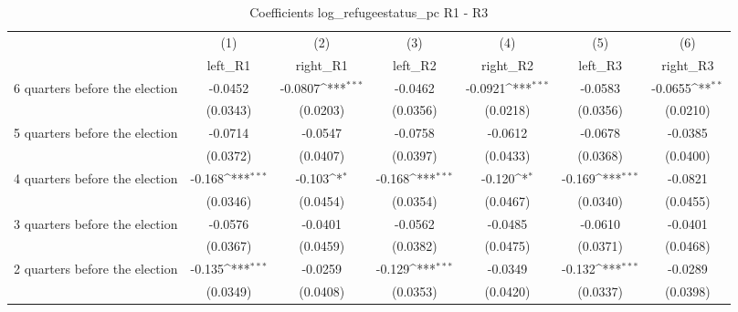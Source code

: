 \begin{table}[htbp]\centering
\def\sym#1{\ifmmode^{#1}\else\(^{#1}\)\fi}
\caption{Coefficients log\_refugeestatus\_pc R1 - R3}
\begin{tabular}{l*{6}{c}}
\hline\hline
                    &\multicolumn{1}{c}{(1)}&\multicolumn{1}{c}{(2)}&\multicolumn{1}{c}{(3)}&\multicolumn{1}{c}{(4)}&\multicolumn{1}{c}{(5)}&\multicolumn{1}{c}{(6)}\\
                    &\multicolumn{1}{c}{left\_R1}&\multicolumn{1}{c}{right\_R1}&\multicolumn{1}{c}{left\_R2}&\multicolumn{1}{c}{right\_R2}&\multicolumn{1}{c}{left\_R3}&\multicolumn{1}{c}{right\_R3}\\
\hline
 6 quarters before the election&     -0.0452         &     -0.0807\sym{***}&     -0.0462         &     -0.0921\sym{***}&     -0.0583         &     -0.0655\sym{**} \\
                    &    (0.0343)         &    (0.0203)         &    (0.0356)         &    (0.0218)         &    (0.0356)         &    (0.0210)         \\
[1em]
 5 quarters before the election&     -0.0714         &     -0.0547         &     -0.0758         &     -0.0612         &     -0.0678         &     -0.0385         \\
                    &    (0.0372)         &    (0.0407)         &    (0.0397)         &    (0.0433)         &    (0.0368)         &    (0.0400)         \\
[1em]
 4 quarters before the election&      -0.168\sym{***}&      -0.103\sym{*}  &      -0.168\sym{***}&      -0.120\sym{*}  &      -0.169\sym{***}&     -0.0821         \\
                    &    (0.0346)         &    (0.0454)         &    (0.0354)         &    (0.0467)         &    (0.0340)         &    (0.0455)         \\
[1em]
 3 quarters before the election&     -0.0576         &     -0.0401         &     -0.0562         &     -0.0485         &     -0.0610         &     -0.0401         \\
                    &    (0.0367)         &    (0.0459)         &    (0.0382)         &    (0.0475)         &    (0.0371)         &    (0.0468)         \\
[1em]
 2 quarters before the election&      -0.135\sym{***}&     -0.0259         &      -0.129\sym{***}&     -0.0349         &      -0.132\sym{***}&     -0.0289         \\
                    &    (0.0349)         &    (0.0408)         &    (0.0353)         &    (0.0420)         &    (0.0337)         &    (0.0398)         \\

\end{tabular}
\end{table}
